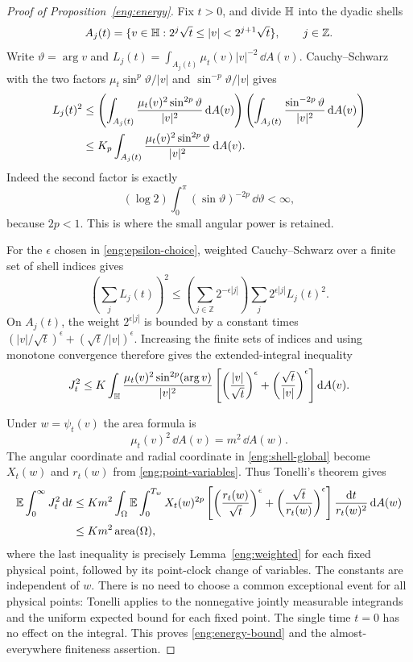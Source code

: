 \begin{proof}[Proof of Proposition~\ref{eng:energy}]
Fix $t>0$, and divide $\mathbb H$ into the dyadic shells
\[
 A_j(t)=\{v\in\mathbb H:2^j\sqrt t\le|v|<2^{j+1}\sqrt t\},
 \qquad j\in\mathbb Z.
\]
Write $\vartheta=\arg v$ and
$L_j(t)=\int_{A_j(t)}\mu_t(v)|v|^{-2}\,\dd A(v)$.
Cauchy--Schwarz with the two factors
$\mu_t\sin^p\vartheta/|v|$ and
$\sin^{-p}\vartheta/|v|$ gives
\begin{align}
 L_j(t)^2
 &\le
 \left(\int_{A_j(t)}
       \frac{\mu_t(v)^2\sin^{2p}\vartheta}{|v|^2}\,\mathrm d A(v)\right)
 \left(\int_{A_j(t)}
       \frac{\sin^{-2p}\vartheta}{|v|^2}\,\mathrm d A(v)\right)\notag\\
 &\le K_p\int_{A_j(t)}
       \frac{\mu_t(v)^2\sin^{2p}\vartheta}{|v|^2}\,\mathrm d A(v).
 \label{eng:shell-cs}
\end{align}
Indeed the second factor is exactly
\[
 (\log2)\int_0^\pi(\sin\vartheta)^{-2p}\,\dd\vartheta<\infty,
\]
because $2p<1$.  This is where the small angular power is retained.

For the $\epsilon$ chosen in \eqref{eng:epsilon-choice}, weighted
Cauchy--Schwarz over a finite set of shell indices gives
\[
 \left(\sum_j L_j(t)\right)^2
 \le\left(\sum_{j\in\mathbb Z}2^{-\epsilon|j|}\right)
      \sum_j2^{\epsilon|j|}L_j(t)^2.
\]
On $A_j(t)$, the weight $2^{\epsilon|j|}$ is bounded by a constant
times
$ (|v|/\sqrt t)^\epsilon+(\sqrt t/|v|)^\epsilon$.
Increasing the finite sets of indices and using monotone convergence
therefore gives the extended-integral inequality
\begin{equation}\label{eng:shell-global}
 J_t^2\le K\int_{\mathbb H}
   \frac{\mu_t(v)^2\sin^{2p}(\arg v)}{|v|^2}
   \left[
     \left(\frac{|v|}{\sqrt t}\right)^\epsilon
    +\left(\frac{\sqrt t}{|v|}\right)^\epsilon
   \right]\mathrm d A(v).
\end{equation}

Under $w=\psi_t(v)$ the area formula is
\[
 \mu_t(v)^2\,\dd A(v)=m^2\,\dd A(w).
\]
The angular coordinate and radial coordinate in
\eqref{eng:shell-global} become $X_t(w)$ and $r_t(w)$ from
\eqref{eng:point-variables}.  Thus Tonelli's theorem gives
\begin{align}
 \mathbb E\int_0^\infty J_t^2\,\mathrm d t
 &\le K m^2\int_\Omega
   \mathbb E\int_0^{T_w}
      X_t(w)^{2p}
      \left[
       \left(\frac{r_t(w)}{\sqrt t}\right)^\epsilon
       +\left(\frac{\sqrt t}{r_t(w)}\right)^\epsilon
      \right]\frac{\mathrm d t}{r_t(w)^2}\,\mathrm d A(w)\notag\\
 &\le K m^2\operatorname{area}(\Omega),
 \label{eng:area-conclusion}
\end{align}
where the last inequality is precisely
Lemma~\ref{eng:weighted} for each fixed physical point, followed by its
point-clock change of variables.  The constants are independent of
$w$.  There is no need to choose a common exceptional event for all
physical points: Tonelli applies to the nonnegative jointly measurable
integrands and the uniform expected bound for each fixed point.  The
single time $t=0$ has no effect on the integral.  This proves
\eqref{eng:energy-bound} and the almost-everywhere finiteness assertion.
\end{proof}

